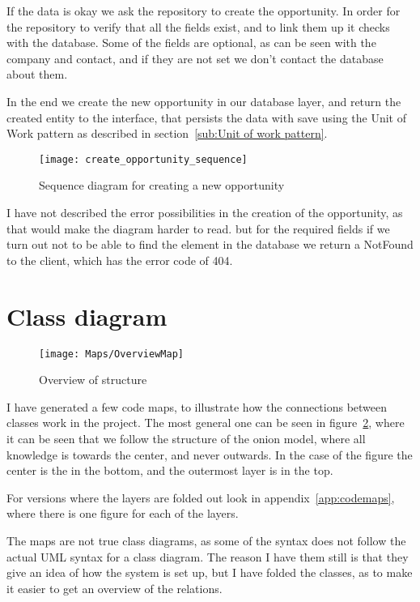 If the data is okay we ask the repository to create the opportunity. In order
for the repository to verify that all the fields exist, and to link them up it
checks with the database. Some of the fields are optional, as can be seen with
the company and contact, and if they are not set we don't contact the database
about them.

In the end we create the new opportunity in our database layer, and return the
created entity to the interface, that persists the data with save using the Unit
of Work pattern as described in section~\ref{sub:Unit of work pattern}.

\begin{figure}[!htb]
  \centering
  \texttt{[image: create\_opportunity\_sequence]}
  \caption{Sequence diagram for creating a new opportunity}
  \label{fig:opportunity_sequence}
\end{figure}

I have not described the error possibilities in the creation of the opportunity,
as that would make the diagram harder to read. but for the required fields if we
turn out not to be able to find the element in the database we return a NotFound
to the client, which has the error code of 404.

\section{Class diagram}
\label{sec:class_diagram, remove namespace limitation}
\begin{figure}[h]
  \centering
  \texttt{[image: Maps/OverviewMap]}
  \caption{Overview of structure}
  \label{fig:overviewMap}
\end{figure}

I have generated a few code maps, to illustrate how the connections between
classes work in the project. The most general one can be seen in
figure~\ref{fig:overviewMap}, where it can be seen that we follow the structure
of the onion model, where all knowledge is towards the center, and never
outwards. In the case of the figure the center is the in the bottom, and the
outermost layer is in the top.

For versions where the layers are folded out look in
appendix~\ref{app:codemaps}, where there is one figure for each of the layers.

The maps are not true class diagrams, as some of the syntax does not follow the
actual UML syntax for a class diagram. The reason I have them still is that they
give an idea of how the system is set up, but I have folded the classes, as to
make it easier to get an overview of the relations.

